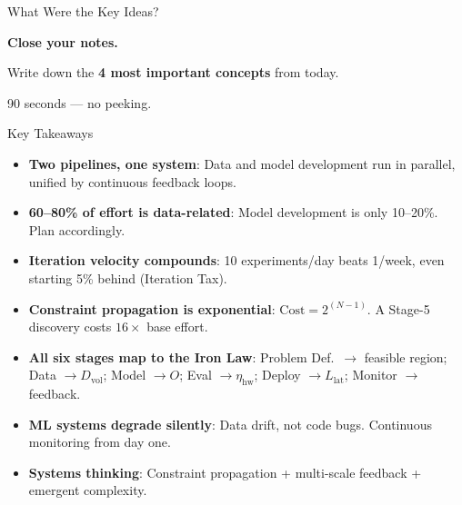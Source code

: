 \documentclass[aspectratio=169, 12pt]{beamer}
\begin{document}
\begin{frame}{What Were the Key Ideas?}
\note{
%
}

\centering
\vspace{1.5cm}
{\Large\bfseries Close your notes.}

\vspace{0.8cm}
{\large Write down the \textbf{4 most important concepts} from today.}

\vspace{0.8cm}
{\normalsize\textcolor{midgray}{90 seconds --- no peeking.}}

\end{frame}

\begin{frame}{Key Takeaways}
\note{
%
}

\footnotesize
\begin{itemize}\setlength\itemsep{1pt}
  \item \textbf{Two pipelines, one system}: Data and model development run in parallel, unified by continuous feedback loops.
  \item \textbf{60--80\% of effort is data-related}: Model development is only 10--20\%. Plan accordingly.
  \item \textbf{Iteration velocity compounds}: 10 experiments/day beats 1/week, even starting 5\% behind (Iteration Tax).
  \item \textbf{Constraint propagation is exponential}: $\text{Cost} = 2^{(N-1)}$. A Stage-5 discovery costs $16\times$ base effort.
  \item \textbf{All six stages map to the Iron Law}: Problem Def.\ $\to$ feasible region; Data $\to D_{\text{vol}}$; Model $\to O$; Eval $\to \eta_{\text{hw}}$; Deploy $\to L_{\text{lat}}$; Monitor $\to$ feedback.
  \item \textbf{ML systems degrade silently}: Data drift, not code bugs. Continuous monitoring from day one.
  \item \textbf{Systems thinking}: Constraint propagation + multi-scale feedback + emergent complexity.
\end{itemize}

\end{frame}
\end{document}
